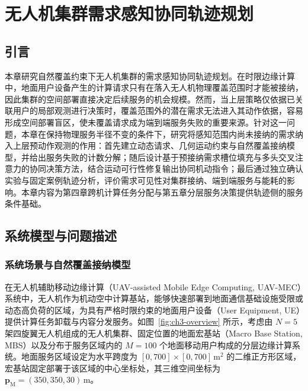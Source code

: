 \chapter{无人机集群需求感知协同轨迹规划}
\label{cha:upper-trajectory}

\section{引言}
\label{sec:ch3-intro}

本章研究自然覆盖约束下无人机集群的需求感知协同轨迹规划。在时限边缘计算中，地面用户设备产生的计算请求只有在落入无人机物理覆盖范围时才能被接纳，因此集群的空间部署直接决定后续服务的机会规模。然而，当上层策略仅依据已关联用户的局部观测进行决策时，覆盖范围外的潜在需求无法进入其动作依据，容易形成空间部署盲区，使未覆盖请求成为端到端服务失败的重要来源。针对这一问题，本章在保持物理服务半径不变的条件下，研究将感知范围内尚未接纳的需求纳入上层预动作观测的作用：首先建立动态请求、几何运动约束与自然覆盖接纳模型，并给出服务失败的计数分解；随后设计基于预接纳需求槽位填充与多头交叉注意力的协同决策方法，结合运动可行性修复输出协同机动指令；最后通过独立确认实验与固定案例轨迹分析，评价需求可见性对集群接纳、端到端服务与能耗的影响。本章内容为第四章跨机计算任务分配与第五章分层服务决策提供轨迹侧的服务条件基础。

\section{系统模型与问题描述}
\label{sec:system-model}
\label{sec:upper-problem}

\subsection{系统场景与自然覆盖接纳模型}
\label{sec:upper-motivation}
\label{sec:system-scenario}

在无人机辅助移动边缘计算（UAV-assisted Mobile Edge Computing, UAV-MEC）系统中，无人机作为机动空中计算基站，能够快速部署到地面通信基础设施受限或动态高负荷的区域，为具有严格时限约束的地面用户设备（User Equipment, UE）提供计算任务卸载与内容分发服务。如图~\ref{fig:ch3-overview} 所示，考虑由 $N=5$ 架四旋翼无人机组成的无人机集群、固定位置的地面宏基站（Macro Base Station, MBS）以及分布于服务区域内的 $M=100$ 个地面移动用户构成的分层边缘计算系统。地面服务区域设定为水平跨度为 $[0, 700]\times[0, 700]\,\mathrm{m}^2$ 的二维正方形区域，宏基站固定部署于该区域的中心坐标处，其三维空间坐标为 $\mathbf p_{\mathrm M}=(350, 350, 30)\,\mathrm{m}$。

